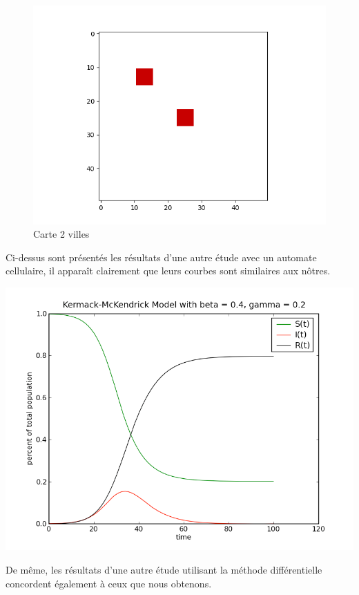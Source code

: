 \documentclass{article}
\begin{document}
\begin{figure}[H]
\caption{Carte 2 villes}
\centering
\includegraphics[scale=0.8]{../images/carte_deux_villes.png}
\end{figure}




Ci-dessus sont présentés les résultats d'une autre étude avec un automate cellulaire, il apparaît clairement que leurs courbes sont similaires aux nôtres.

\includegraphics[scale=0.5]{../images/differentiel_1.png} 

De même, les résultats d'une autre étude utilisant la méthode différentielle concordent également à ceux que nous obtenons.
\end{document}
